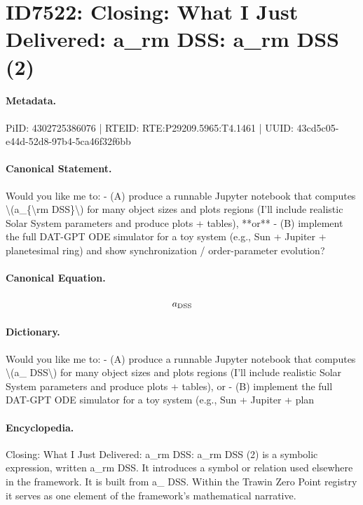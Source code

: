 \section*{ID7522: Closing: What I Just Delivered: a\_rm DSS: a\_rm DSS (2)}
\paragraph{Metadata.}
PiID: 4302725386076 | RTEID: RTE:P29209.5965:T4.1461 | UUID: 43cd5c05-e44d-52d8-97b4-5ca46f32f6bb

\paragraph{Canonical Statement.}
Would you like me to: - (A) produce a runnable Jupyter notebook that computes \textbackslash{}(a\_\{\textbackslash{}rm DSS\}\textbackslash{}) for many object sizes and plots regions (I’ll include realistic Solar System parameters and produce plots + tables), **or** - (B) implement the full DAT-GPT ODE simulator for a toy system (e.g., Sun + Jupiter + planetesimal ring) and show synchronization / order-parameter evolution?

\paragraph{Canonical Equation.}
\[
a_{\rm DSS}
\]

\paragraph{Dictionary.}
Would you like me to: - (A) produce a runnable Jupyter notebook that computes \textbackslash{}(a\_ DSS\textbackslash{}) for many object sizes and plots regions (I’ll include realistic Solar System parameters and produce plots + tables), or - (B) implement the full DAT-GPT ODE simulator for a toy system (e.g., Sun + Jupiter + plan

\paragraph{Encyclopedia.}
Closing: What I Just Delivered: a\_rm DSS: a\_rm DSS (2) is a symbolic expression, written a\_rm DSS. It introduces a symbol or relation used elsewhere in the framework. It is built from a\_ DSS. Within the Trawin Zero Point registry it serves as one element of the framework's mathematical narrative.
